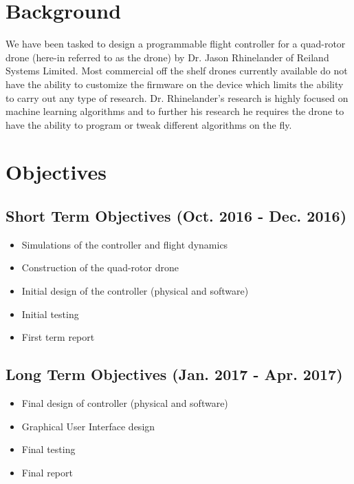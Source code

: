 \documentclass{texMemo}
\begin{document}
\maketitle

\section{Background}
We have been tasked to design a programmable flight controller for a quad-rotor drone (here-in referred to as the drone) by Dr. Jason Rhinelander of Reiland Systems Limited. Most commercial off the shelf drones currently available do not have the ability to customize the firmware on the device which limits the ability to carry out any type of research. Dr. Rhinelander’s research is highly focused on machine learning algorithms and to further his research he requires the drone to have the ability to program or tweak different algorithms on the fly. 
\section{Objectives}
\subsection{Short Term Objectives (Oct. 2016 - Dec. 2016)}
\begin{itemize}
	\item Simulations of the controller and flight dynamics 
	\item Construction of the quad-rotor drone
	\item Initial design of the controller (physical and software)
	\item Initial testing
	\item First term report
\end{itemize}
\subsection{Long Term Objectives (Jan. 2017 - Apr. 2017)}
\begin{itemize}
	\item Final design of controller (physical and software)
	\item Graphical User Interface design
	\item Final testing 
	\item Final report
\end{itemize}
\end{document}
